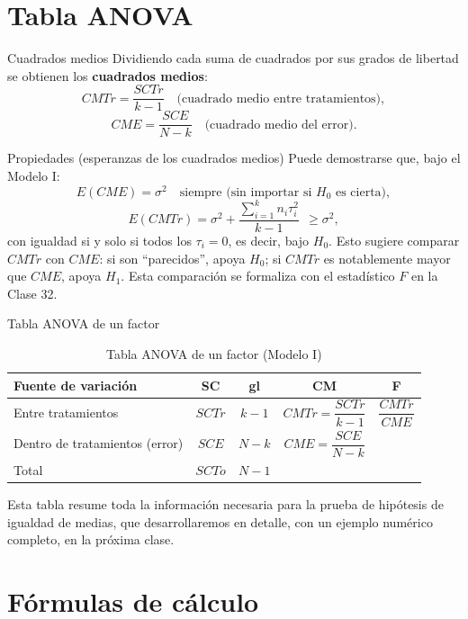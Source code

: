 \documentclass[aspectratio=169,11pt]{beamer}
\begin{document}
\section{Tabla ANOVA}

\begin{frame}{Cuadrados medios}
Dividiendo cada suma de cuadrados por sus grados de libertad se obtienen los \textbf{cuadrados medios}:
\[
CMTr = \frac{SCTr}{k-1} \quad\text{(cuadrado medio entre tratamientos)},
\]
\[
CME = \frac{SCE}{N-k} \quad\text{(cuadrado medio del error)}.
\]

\begin{block}{Propiedades (esperanzas de los cuadrados medios)}
Puede demostrarse que, bajo el Modelo I:
\[
E(CME) = \sigma^2 \quad \text{siempre (sin importar si $H_0$ es cierta)},
\]
\[
E(CMTr) = \sigma^2 + \frac{\sum_{i=1}^k n_i \tau_i^2}{k-1} \ \ \geq \sigma^2,
\]
con igualdad si y solo si todos los $\tau_i=0$, es decir, bajo $H_0$. Esto sugiere comparar $CMTr$ con $CME$: si son ``parecidos'', apoya $H_0$; si $CMTr$ es notablemente mayor que $CME$, apoya $H_1$. Esta comparación se formaliza con el estadístico $F$ en la Clase 32.
\end{block}
\end{frame}

\begin{frame}{Tabla ANOVA de un factor}
\begin{table}[htbp]
\centering
\begin{tabular}{lcccc}
\toprule
Fuente de variación & SC & gl & CM & F \\
\midrule
Entre tratamientos & $SCTr$ & $k-1$ & $CMTr=\dfrac{SCTr}{k-1}$ & $\dfrac{CMTr}{CME}$ \\[8pt]
Dentro de tratamientos (error) & $SCE$ & $N-k$ & $CME=\dfrac{SCE}{N-k}$ & \\[8pt]
\midrule
Total & $SCTo$ & $N-1$ & & \\
\bottomrule
\end{tabular}
\caption{Tabla ANOVA de un factor (Modelo I)}
\end{table}

Esta tabla resume toda la información necesaria para la prueba de hipótesis de igualdad de medias, que desarrollaremos en detalle, con un ejemplo numérico completo, en la próxima clase.
\end{frame}

\section{Fórmulas de cálculo}
\end{document}
